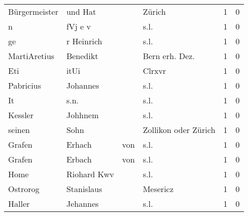 \documentclass[10pt,a4paper,landscape]{article}
\begin{document}
\begin{longtable}{llllrr}
            Bürgermeister &                            und Hat &             &                                      Zürich &          1 &         0 \\
                        n &                            fVj e v &             &                                        s.l. &          1 &         0 \\
                       ge &                         r Heinrich &             &                                        s.l. &          1 &         0 \\
             MartiAretius &                           Benedikt &             &                             Bern erh. Dez.  &          1 &         0 \\
                      Eti &                               itUi &             &                                      Clrxvr &          1 &         0 \\
                Pabricius &                           Johannes &             &                                        s.l. &          1 &         0 \\
                       It &                               s.n. &             &                                        s.l. &          1 &         0 \\
                  Kessler &                            Johhnem &             &                                        s.l. &          1 &         0 \\
                   seinen &                               Sohn &             &                        Zollikon oder Zürich &          1 &         0 \\
                   Grafen &                             Erhach &         von &                                        s.l. &          1 &         0 \\
                   Grafen &                             Erbach &         von &                                        s.l. &          1 &         0 \\
                     Home &                        Riohard Kwv &             &                                        s.l. &          1 &         0 \\
                 Ostrorog &                         Stanislaus &             &                                    Mesericz &          1 &         0 \\
                   Haller &                           Jehannes &             &                                        s.l. &          1 &         0 \\

\end{longtable}
\end{document}

